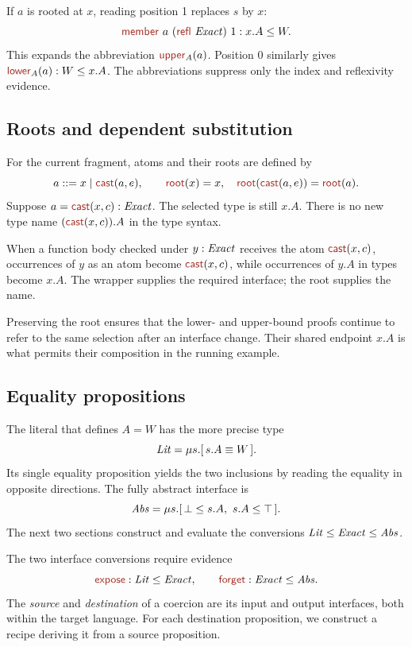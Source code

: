 If $a$ is rooted at $x$, reading position 1 replaces $s$ by $x$:
\[
 \ev{member}\ a\ (\ev{refl}\ \ty{Exact})\ 1:x.A\le W.
\]
This expands the abbreviation $\ev{upper}_A(a)$. Position 0 similarly
gives $\ev{lower}_A(a):W\le x.A$. The abbreviations suppress only the
index and reflexivity evidence.

\subsection*{Roots and dependent substitution}
For the current fragment, atoms and their roots are defined by
\[
 a::=x\mid\cast{a}{e},\qquad
 \ev{root}(x)=x,\quad
 \ev{root}(\cast{a}{e})=\ev{root}(a).
\]
Suppose $a=\cast{x}{c}:\ty{Exact}$. The selected type is still $x.A$.
There is no new type name $(\cast{x}{c}).A$ in the type syntax.

When a function body checked under
$y:\mathit{Exact}$ receives the atom $\cast{x}{c}$, occurrences of
$y$ as an atom become $\cast{x}{c}$, while occurrences of $y.A$ in
types become $x.A$. The wrapper supplies the required interface; the
root supplies the name.

Preserving the root ensures that the lower- and upper-bound proofs
continue to refer to the same selection after an interface change.
Their shared endpoint $x.A$ is what permits their composition in the
running example.

\subsection*{Equality propositions}
The literal that defines $A=W$ has the more precise type
\[
 \mathit{Lit}=\mu s.[\,s.A\equiv W\,].
\]
Its single equality proposition yields the two inclusions by reading
the equality in opposite directions. The fully abstract interface is
\[
 \mathit{Abs}=\mu s.[\,\bot\le s.A,\ s.A\le\top\,].
\]
The next two sections construct and evaluate the conversions
$\mathit{Lit}\le\mathit{Exact}\le\mathit{Abs}$.


\label{sec:recipes}

The two interface conversions require evidence
\[
 \ev{expose}:\ty{Lit}\le\ty{Exact},\qquad
 \ev{forget}:\ty{Exact}\le\ty{Abs}.
\]
The \emph{source} and \emph{destination} of a coercion are its input and
output interfaces, both within the target language. For each destination
proposition, we construct a recipe deriving it from a source proposition.

